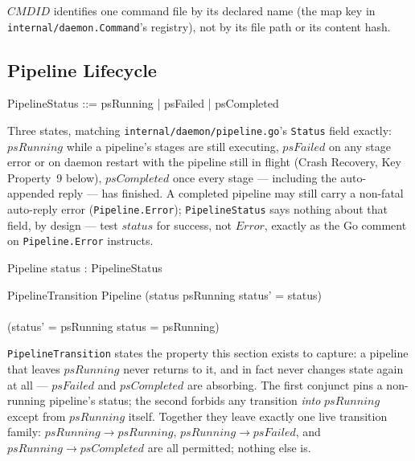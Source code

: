 \documentclass[a4paper,10pt,fleqn]{article}
\begin{document}
\begin{zed}
  [CMDID]
\end{zed}

$CMDID$ identifies one command file by its declared name (the map
key in \texttt{internal/daemon.Command}'s registry), not by its
file path or its content hash.

\subsection{Pipeline Lifecycle}

\begin{zed}
  PipelineStatus ::= psRunning | psFailed | psCompleted
\end{zed}

Three states, matching \texttt{internal/daemon/pipeline.go}'s
\texttt{Status} field exactly: $psRunning$ while a pipeline's stages
are still executing, $psFailed$ on any stage error or on daemon
restart with the pipeline still in flight (Crash Recovery, Key
Property~9 below), $psCompleted$ once every stage --- including the
auto-appended reply --- has finished.  A completed pipeline may
still carry a non-fatal auto-reply error (\texttt{Pipeline.Error});
\texttt{PipelineStatus} says nothing about that field, by design ---
test $status$ for success, not $Error$, exactly as the Go comment on
\texttt{Pipeline.Error} instructs.

\begin{schema}{Pipeline}
  status : PipelineStatus
\end{schema}

\begin{schema}{PipelineTransition}
  \Delta Pipeline
  \where
  (status \neq psRunning \implies status' = status) \\
  \land \\
  (status' = psRunning \implies status = psRunning)
\end{schema}

\texttt{PipelineTransition} states the property this section exists
to capture: a pipeline that leaves $psRunning$ never returns to it,
and in fact never changes state again at all --- $psFailed$ and
$psCompleted$ are absorbing.  The first conjunct pins a
non-running pipeline's status; the second forbids any transition
\emph{into} $psRunning$ except from $psRunning$ itself.  Together
they leave exactly one live transition family: $psRunning \to
psRunning$, $psRunning \to psFailed$, and $psRunning \to
psCompleted$ are all permitted; nothing else is.
\end{document}
